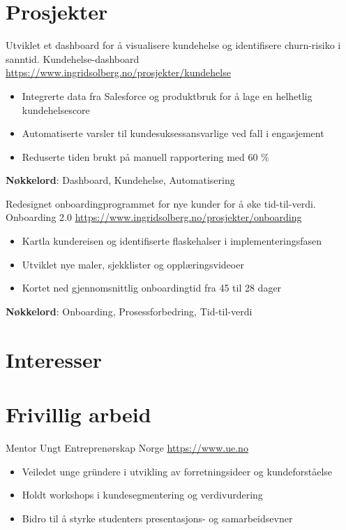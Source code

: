 \documentclass[a4paper, serif, 10pt]{moderncv}
\begin{document}
\section{Prosjekter}

        {Utviklet et dashboard for å visualisere kundehelse og identifisere churn-risiko i sanntid.}
        {Kundehelse-dashboard}
        {\url{https://www.ingridsolberg.no/prosjekter/kundehelse}}
        {}
        {\begin{itemize}
\item Integrerte data fra Salesforce og produktbruk for å lage en helhetlig kundehelsescore
\item Automatiserte varsler til kundesuksessansvarlige ved fall i engasjement
\item Reduserte tiden brukt på manuell rapportering med 60 \%
\end{itemize}
\textbf{Nøkkelord}: Dashboard, Kundehelse, Automatisering}

        {Redesignet onboardingprogrammet for nye kunder for å øke tid-til-verdi.}
        {Onboarding 2.0}
        {\url{https://www.ingridsolberg.no/prosjekter/onboarding}}
        {}
        {\begin{itemize}
\item Kartla kundereisen og identifiserte flaskehalser i implementeringsfasen
\item Utviklet nye maler, sjekklister og opplæringsvideoer
\item Kortet ned gjennomsnittlig onboardingtid fra 45 til 28 dager
\end{itemize}
\textbf{Nøkkelord}: Onboarding, Prosessforbedring, Tid-til-verdi}
\section{Interesser}

\section{Frivillig arbeid}

        {Mentor}
        {Ungt Entreprenørskap Norge}
        {\url{https://www.ue.no}}
        {}
        {\begin{itemize}
\item Veiledet unge gründere i utvikling av forretningsideer og kundeforståelse
\item Holdt workshops i kundesegmentering og verdivurdering
\item Bidro til å styrke studenters presentasjons- og samarbeidsevner
\end{itemize}}
    
\end{document}
